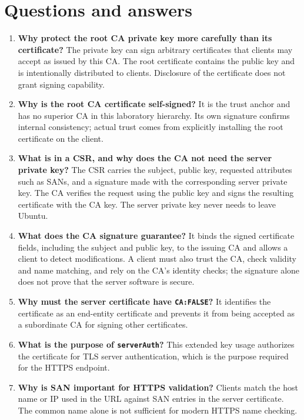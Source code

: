 \documentclass[a4paper,11pt]{article}
\begin{document}
\section{Questions and answers}
\begin{enumerate}[leftmargin=*,label=\textbf{\arabic*.}]
\item \textbf{Why protect the root CA private key more carefully than its certificate?}
The private key can sign arbitrary certificates that clients may accept as issued by
this CA. The root certificate contains the public key and is intentionally distributed
to clients. Disclosure of the certificate does not grant signing capability.

\item \textbf{Why is the root CA certificate self-signed?}
It is the trust anchor and has no superior CA in this laboratory hierarchy. Its own
signature confirms internal consistency; actual trust comes from explicitly installing
the root certificate on the client.

\item \textbf{What is in a CSR, and why does the CA not need the server private key?}
The CSR carries the subject, public key, requested attributes such as SANs, and a
signature made with the corresponding server private key. The CA verifies the request
using the public key and signs the resulting certificate with the CA key. The server
private key never needs to leave Ubuntu.

\item \textbf{What does the CA signature guarantee?}
It binds the signed certificate fields, including the subject and public key, to the
issuing CA and allows a client to detect modifications. A client must also trust the
CA, check validity and name matching, and rely on the CA's identity checks; the
signature alone does not prove that the server software is secure.

\item \textbf{Why must the server certificate have \texttt{CA:FALSE}?}
It identifies the certificate as an end-entity certificate and prevents it from being
accepted as a subordinate CA for signing other certificates.

\item \textbf{What is the purpose of \texttt{serverAuth}?}
This extended key usage authorizes the certificate for TLS server authentication,
which is the purpose required for the HTTPS endpoint.

\item \textbf{Why is SAN important for HTTPS validation?}
Clients match the host name or IP used in the URL against SAN entries in the server
certificate. The common name alone is not sufficient for modern HTTPS name checking.


\end{enumerate}
\end{document}
